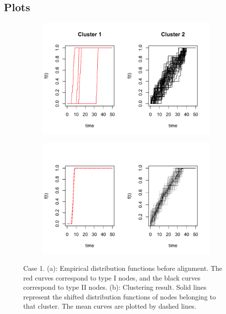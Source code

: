 \subsection{Plots}
\begin{figure}[H]
\begin{subfigure}{.8\textwidth}
\includegraphics[width=\linewidth]{../simulation/plots/f_list_1}
\caption{}
\label{fig: original curves}
\end{subfigure}
\begin{subfigure}{.8\textwidth}
\includegraphics[width=\linewidth]{../simulation/plots/clus_results_1}
\caption{}
\label{fig: aligned curves}
\end{subfigure}
\caption{Case 1. (a): Empirical distribution functions before alignment. The red curves correspond to type I nodes, and the black curves correspond to type II nodes. (b): Clustering result. Solid lines represent the shifted distribution functions of nodes belonging to that cluster. The mean curves are plotted by dashed lines. }
\end{figure}



